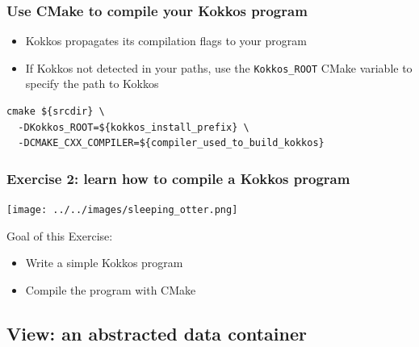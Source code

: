 \documentclass[aspectratio=169]{beamer}
\begin{document}
\begin{frame}[fragile]

\frametitle{Use CMake to compile your Kokkos program}

\begin{itemize}
    \item Kokkos propagates its compilation flags to your program
    \item If Kokkos not detected in your paths, use the \texttt{Kokkos\_ROOT} CMake variable to specify the path to Kokkos
\end{itemize}

\small
\begin{verbatim}
cmake ${srcdir} \
  -DKokkos_ROOT=${kokkos_install_prefix} \
  -DCMAKE_CXX_COMPILER=${compiler_used_to_build_kokkos}
\end{verbatim}

\end{frame}


\begin{frame}[fragile]
    \frametitle{Exercise 2: learn how to compile a Kokkos program} 

    \begin{center}
    \texttt{[image: ../../images/sleeping\_otter.png]}
    \end{center}

    Goal of this Exercise:

    \begin{itemize}
        \item Write a simple Kokkos program
        \item Compile the program with CMake
    \end{itemize}

\end{frame}



\subsection[Data container]{View: an abstracted data container}

\end{document}
